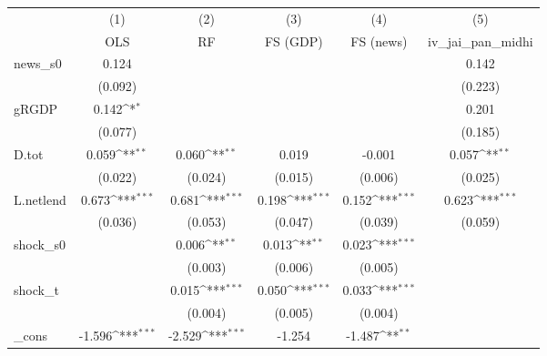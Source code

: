 {
\def\sym#1{\ifmmode^{#1}\else\(^{#1}\)\fi}
\begin{tabular}{l*{5}{c}}
\toprule
            &\multicolumn{1}{c}{(1)}&\multicolumn{1}{c}{(2)}&\multicolumn{1}{c}{(3)}&\multicolumn{1}{c}{(4)}&\multicolumn{1}{c}{(5)}\\
            &\multicolumn{1}{c}{OLS}&\multicolumn{1}{c}{RF}&\multicolumn{1}{c}{FS (GDP)}&\multicolumn{1}{c}{FS (news)}&\multicolumn{1}{c}{iv\_jai\_pan\_midhi}\\
\midrule
news\_s0     &       0.124         &                     &                     &                     &       0.142         \\
            &     (0.092)         &                     &                     &                     &     (0.223)         \\
\addlinespace
gRGDP       &       0.142\sym{*}  &                     &                     &                     &       0.201         \\
            &     (0.077)         &                     &                     &                     &     (0.185)         \\
\addlinespace
D.tot       &       0.059\sym{**} &       0.060\sym{**} &       0.019         &      -0.001         &       0.057\sym{**} \\
            &     (0.022)         &     (0.024)         &     (0.015)         &     (0.006)         &     (0.025)         \\
\addlinespace
L.netlend   &       0.673\sym{***}&       0.681\sym{***}&       0.198\sym{***}&       0.152\sym{***}&       0.623\sym{***}\\
            &     (0.036)         &     (0.053)         &     (0.047)         &     (0.039)         &     (0.059)         \\
\addlinespace
shock\_s0    &                     &       0.006\sym{**} &       0.013\sym{**} &       0.023\sym{***}&                     \\
            &                     &     (0.003)         &     (0.006)         &     (0.005)         &                     \\
\addlinespace
shock\_t     &                     &       0.015\sym{***}&       0.050\sym{***}&       0.033\sym{***}&                     \\
            &                     &     (0.004)         &     (0.005)         &     (0.004)         &                     \\
\addlinespace
\_cons      &      -1.596\sym{***}&      -2.529\sym{***}&      -1.254         &      -1.487\sym{**} &                     \\

\end{tabular}}
